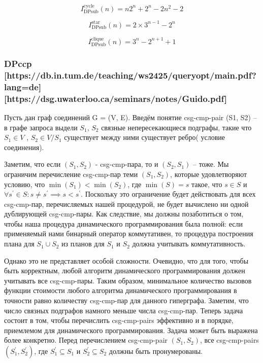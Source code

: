 \documentclass[12pt]{article}
\begin{document}
\begin{flushleft}
\[
I^{\text{cycle}}_{\text{DPsub}}(n) =
n2^{n} + 2^{n} - 2n^2 - 2
\]

\[
I^{\text{star}}_{\text{DPsub}}(n) =
2 \times 3^{n-1} - 2^{n}
\]

\[
I^{\text{clique}}_{\text{DPsub}}(n) =
3^n - 2^{n+1} + 1
\]

\centering \subsubsection*{DPccp [https://db.in.tum.de/teaching/ws2425/queryopt/main.pdf?lang=de][https://dsg.uwaterloo.ca/seminars/notes/Guido.pdf]}
\raggedright
Пусть дан граф соединений G = (V, E).
Введём понятие csg-cmp-pair (S1, S2) -- в графе запроса выдели $S_1$, 
$S_2$ связные непересекающиеся подграфы, такие что $S_1 \in V$ , 
$S_2 \in V/S_1$  существует между ними существует ребро( условие 
соединения).

Заметим, что если $(S_1, S_2)$ - csg-cmp-пара, то и $(S_2, S_1)$
-- тоже. Мы ограничим перечисление csg-cmp-пар теми $(S_1, S_2)$, 
которые удовлетворяют условию, что $\min(S_1) < \min(S_2)$, 
где $\min(S) = s$ такое, что 
$s \in S$ и $\forall  s^{'} \in  S : s \neq s^{'} \implies  s < s^{'}$. 
Поскольку это ограничение будет действовать для всех csg-cmp-пар, перечисляемых нашей процедурой, 
не будет вычислено ни одной дублирующей csg-cmp-пары. Как следствие, мы должны позаботиться о том, 
чтобы наша процедура динамического программирования была полной: если применяемый 
нами бинарный оператор коммутативен, то процедура построения плана для $ S_ 1 \cup S_2$ 
из планов для $S_1$ и $S_2$ должна учитывать коммутативность.

Однако это не представляет особой сложности. Очевидно, что для того, 
чтобы быть корректным, любой алгоритм динамического программирования 
должен учитывать все csg-cmp-пары.  Таким образом, минимальное 
количество вызовов функции стоимости любого алгоритма динамического 
программирования в точности равно количеству csg-cmp-пар для данного 
гиперграфа. Заметим, что число связных подграфов намного меньше числа 
csg-cmp-пар. Теперь задача состоит в том, чтобы перечислить csg-cmp-pairs 
эффективно и в порядке, приемлемом для динамического программирования. 
Задача может быть выражена более конкретно. Перед перечислением csg-cmp-pair $(S_1, S_2)$, 
все csg-cmp-pairs $(S^{'}_1, S^{'}_2)$, где $S^{'}_1 \subseteq  S_1$ 
и $S^{'}_2 \subseteq  S_2$ должны быть пронумерованы.


\end{flushleft}
\end{document}
